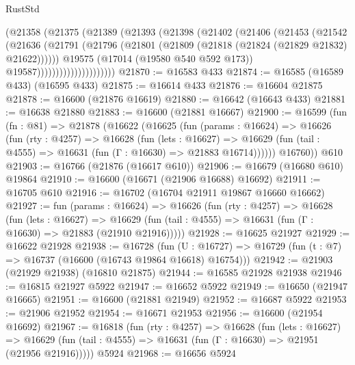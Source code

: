\begin{lexlean}{RustStd}
\begin{coremodule}
                          (@21358
                            (@21375
                              (@21389
                                (@21393
                                  (@21398
                                    (@21402
                                      (@21406
                                        (@21453
                                          (@21542
                                            (@21636
                                              (@21791
                                                (@21796
                                                  (@21801
                                                    (@21809
                                                      (@21818 (@21824 (@21829 @21832) @21622))))))
                                              @19575
                                              (@17014 (@19580 @540 @592 @173))
                                              @19587)))))))))))))))))))))
@21870 := @16583 @433
@21874 := @16585 (@16589 @433) (@16595 @433)
@21875 := @16614 @433
@21876 := @16604 @21875
@21878 := @16600 (@21876 @16619)
@21880 := @16642 (@16643 @433)
@21881 := @16638 @21880
@21883 := @16600 (@21881 @16667)
@21900 := @16599
    (fun (fn : @81) =>
    @21878
      (@16622
        (@16625
          (fun (params : @16624) =>
          @16626
            (fun (rty : @4257) =>
            @16628
              (fun (lets : @16627) =>
              @16629 (fun (tail : @4555) => @16631 (fun (Γ : @16630) => @21883 @16714))))))
        @16760))
    @610
@21903 := @16766 (@21876 (@16617 @610))
@21906 := @16679 (@16680 @610) @19864
@21910 := @16600 (@16671 (@21906 @16688) @16692)
@21911 := @16705 @610
@21916 := @16702 (@16704 @21911 @19867 @16660 @16662)
@21927 := fun (params : @16624) =>
  @16626
    (fun (rty : @4257) =>
    @16628
      (fun (lets : @16627) =>
      @16629 (fun (tail : @4555) => @16631 (fun (Γ : @16630) => @21883 (@21910 @21916)))))
@21928 := @16625 @21927
@21929 := @16622 @21928
@21938 := @16728
    (fun (U : @16727) => @16729 (fun (t : @7) => @16737 (@16600 (@16743 @19864 @16618) @16754)))
@21942 := @21903 (@21929 @21938) (@16810 @21875)
@21944 := @16585 @21928 @21938
@21946 := @16815 @21927 @5922
@21947 := @16652 @5922
@21949 := @16650 (@21947 @16665)
@21951 := @16600 (@21881 @21949)
@21952 := @16687 @5922
@21953 := @21906 @21952
@21954 := @16671 @21953
@21956 := @16600 (@21954 @16692)
@21967 := @16818
    (fun (rty : @4257) =>
    @16628
      (fun (lets : @16627) =>
      @16629 (fun (tail : @4555) => @16631 (fun (Γ : @16630) => @21951 (@21956 @21916)))))
    @5924
@21968 := @16656 @5924

\end{coremodule}
\end{lexlean}
